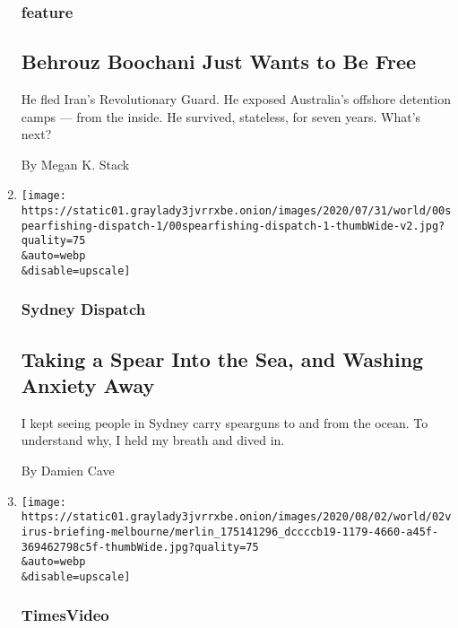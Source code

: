 \begin{enumerate}
{  \subsubsection{feature}\label{feature}}

  \hypertarget{behrouz-boochani-just-wants-to-be-free}{%
  \subsection{Behrouz Boochani Just Wants to Be
  Free}\label{behrouz-boochani-just-wants-to-be-free}}

  He fled Iran's Revolutionary Guard. He exposed Australia's offshore
  detention camps --- from the inside. He survived, stateless, for seven
  years. What's next?

  By Megan K. Stack
\item
  \href{/2020/08/03/world/australia/spearfishing-sydney-coronavirus.html}{}

  \texttt{[image: https://static01.graylady3jvrrxbe.onion/images/2020/07/31/world/00spearfishing-dispatch-1/00spearfishing-dispatch-1-thumbWide-v2.jpg?quality=75\\\&auto=webp\\\&disable=upscale]}

  \hypertarget{sydney-dispatch}{%
  \subsubsection{Sydney Dispatch}\label{sydney-dispatch}}

  \hypertarget{taking-a-spear-into-the-sea-and-washing-anxiety-away}{%
  \subsection{Taking a Spear Into the Sea, and Washing Anxiety
  Away}\label{taking-a-spear-into-the-sea-and-washing-anxiety-away}}

  I kept seeing people in Sydney carry spearguns to and from the ocean.
  To understand why, I held my breath and dived in.

  By Damien Cave
\item
  \href{/video/world/australia/100000007269116/coronavirus-restrictions-melbourne.html}{}

  \texttt{[image: https://static01.graylady3jvrrxbe.onion/images/2020/08/02/world/02virus-briefing-melbourne/merlin\_175141296\_dccccb19-1179-4660-a45f-369462798c5f-thumbWide.jpg?quality=75\\\&auto=webp\\\&disable=upscale]}

  \hypertarget{timesvideo}{%
  \subsubsection{TimesVideo}\label{timesvideo}}


\end{enumerate}
